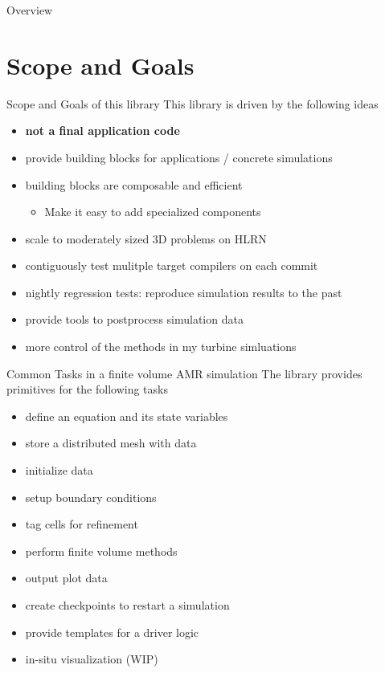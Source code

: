 \documentclass[ucs,9pt]{beamer}
\begin{document}
\begin{frame}{Overview}
  \tableofcontents
\end{frame}

\section{Scope and Goals}
\begin{frame}{Scope and Goals of this library}
This library is driven by the following ideas
\begin{itemize}
	\item \textbf{not a final application code}
	\item provide building blocks for applications / concrete simulations
	\item building blocks are composable and efficient\\
	\begin{itemize} \item Make it easy to add specialized components \end{itemize}
	\item scale to moderately sized 3D problems on HLRN
	\item contiguously test mulitple target compilers on each commit
	\item nightly regression tests: reproduce simulation results to the past
	\item provide tools to postprocess simulation data

	\vspace{0.5cm}
	\item more control of the methods in my turbine simluations
\end{itemize}
\end{frame}


\begin{frame}{Common Tasks in a finite volume AMR simulation}
The library provides primitives for the following tasks

\vspace{0.4cm}
\begin{itemize}
	\item define an equation and its state variables
	\item store a distributed mesh with data
	\item initialize data
	\item setup boundary conditions
	\item tag cells for refinement
	\item perform finite volume methods
	\item output plot data
	\item create checkpoints to restart a simulation
	\item provide templates for a driver logic
	\item in-situ visualization (WIP)
\end{itemize}
\end{frame}
\end{document}
